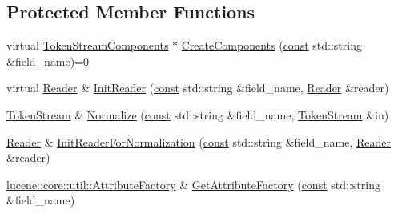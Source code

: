 \subsection*{Protected Member Functions}
\begin{DoxyCompactItemize}
\item 
virtual \mbox{\hyperlink{classlucene_1_1core_1_1analysis_1_1TokenStreamComponents}{Token\+Stream\+Components}} $\ast$ \mbox{\hyperlink{classlucene_1_1core_1_1analysis_1_1Analyzer_a9b7dc3c598057fbf4e9b5f48066cb54a}{Create\+Components}} (\mbox{\hyperlink{ZlibCrc32_8h_a2c212835823e3c54a8ab6d95c652660e}{const}} std\+::string \&field\+\_\+name)=0
\item 
virtual \mbox{\hyperlink{classlucene_1_1core_1_1analysis_1_1Reader}{Reader}} \& \mbox{\hyperlink{classlucene_1_1core_1_1analysis_1_1Analyzer_aed8b22b06eab4ecd4f3d568cadab8b09}{Init\+Reader}} (\mbox{\hyperlink{ZlibCrc32_8h_a2c212835823e3c54a8ab6d95c652660e}{const}} std\+::string \&field\+\_\+name, \mbox{\hyperlink{classlucene_1_1core_1_1analysis_1_1Reader}{Reader}} \&reader)
\item 
\mbox{\hyperlink{classlucene_1_1core_1_1analysis_1_1TokenStream}{Token\+Stream}} \& \mbox{\hyperlink{classlucene_1_1core_1_1analysis_1_1Analyzer_a9c76b9071c95ee8347b0f8ae2a208e6e}{Normalize}} (\mbox{\hyperlink{ZlibCrc32_8h_a2c212835823e3c54a8ab6d95c652660e}{const}} std\+::string \&field\+\_\+name, \mbox{\hyperlink{classlucene_1_1core_1_1analysis_1_1TokenStream}{Token\+Stream}} \&in)
\item 
\mbox{\hyperlink{classlucene_1_1core_1_1analysis_1_1Reader}{Reader}} \& \mbox{\hyperlink{classlucene_1_1core_1_1analysis_1_1Analyzer_ae261718804348d65059b44feb6349496}{Init\+Reader\+For\+Normalization}} (\mbox{\hyperlink{ZlibCrc32_8h_a2c212835823e3c54a8ab6d95c652660e}{const}} std\+::string \&field\+\_\+name, \mbox{\hyperlink{classlucene_1_1core_1_1analysis_1_1Reader}{Reader}} \&reader)
\item 
\mbox{\hyperlink{classlucene_1_1core_1_1util_1_1AttributeFactory}{lucene\+::core\+::util\+::\+Attribute\+Factory}} \& \mbox{\hyperlink{classlucene_1_1core_1_1analysis_1_1Analyzer_af0c3e02aef0e7a391b0abdbca218951b}{Get\+Attribute\+Factory}} (\mbox{\hyperlink{ZlibCrc32_8h_a2c212835823e3c54a8ab6d95c652660e}{const}} std\+::string \&field\+\_\+name)
\end{DoxyCompactItemize}
